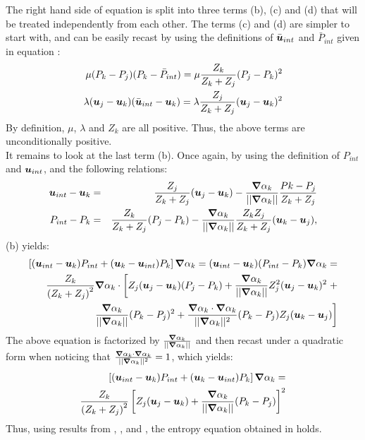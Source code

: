 The right hand side of equation  is split into three terms (b), (c) and (d) that will be treated independently from each other. The terms (c) and (d) are simpler to start with, and can be easily recast by using the definitions of $\bar{\boldsymbol u}_{int}$ and $\bar{P}_{int}$ given in equation :
\begin{eqnarray}
\label{eq:ent4}
\mu (P_k-P_j)(P_k-\bar{P}_{int}) = \mu \frac{Z_k}{Z_k+Z_j} (P_j - P_k)^2\nonumber\\
\lambda(\boldsymbol u_j-\boldsymbol u_k)(\bar{\boldsymbol u}_{int}-\boldsymbol u_k) = \lambda \frac{Z_j}{Z_k+Z_j} (\boldsymbol u_j - \boldsymbol u_k)^2 
\end{eqnarray}
By definition, $\mu$, $\lambda$ and $Z_k$ are all positive. Thus, the above terms are unconditionally positive. \\
It remains to look at the last term (b). Once again, by using the definition of $P_{int}$ and $\boldsymbol u_{int}$, and the following relations:
\begin{eqnarray}
\label{eq:ent4bis}
\boldsymbol u_{int}-\boldsymbol u_k &=& \frac{Z_j}{Z_k+Z_j}(\boldsymbol u_j-\boldsymbol u_k) -  \frac{\boldsymbol{\nabla} \alpha_k}{|| \boldsymbol{\nabla} \alpha_k ||} \frac{Pk-P_j}{Z_k+Z_j} \nonumber\\
P_{int}-P_k &=& \frac{Z_k}{Z_k+Z_j} (P_j-P_k) - \frac{\boldsymbol{\nabla} \alpha_k}{|| \boldsymbol{\nabla} \alpha_k ||} \frac{Z_k Z_j}{Z_k+Z_j} (\boldsymbol u_k-\boldsymbol u_j), \nonumber 
\end{eqnarray}
(b) yields:
\begin{eqnarray}
\label{eq:ent5}
\left[ (\boldsymbol u_{int}-\boldsymbol u_k)P_{int} + (\boldsymbol u_k-\boldsymbol u_{int})P_k \right] \boldsymbol{\nabla} \alpha_k = (\boldsymbol u_{int}-\boldsymbol u_k)(P_{int}-P_k) \boldsymbol{\nabla} \alpha_k=  \nonumber\\ \frac{Z_k}{\left( Z_k+Z_j \right)^2} \boldsymbol{\nabla} \alpha_k \cdot \left[ Z_j (\boldsymbol u_j-\boldsymbol u_k)(P_j-P_k)+\frac{\boldsymbol{\nabla} \alpha_k}{|| \boldsymbol{\nabla} \alpha_k ||} Z_j^2 (\boldsymbol u_j-\boldsymbol u_k)^2 \right. + \\ \left. \frac{\boldsymbol{\nabla} \alpha_k}{|| \boldsymbol{\nabla} \alpha_k ||}(P_k-P_j)^2 +  \frac{\boldsymbol{\nabla} \alpha_k \cdot \boldsymbol{\nabla} \alpha_k}{|| \boldsymbol{\nabla} \alpha_k ||^2}(P_k-P_j)Z_j (\boldsymbol u_k-\boldsymbol u_j) \right] \nonumber
\end{eqnarray}
The above equation is factorized by $\frac{\boldsymbol{\nabla} \alpha_k}{|| \boldsymbol{\nabla} \alpha_k ||}$ and then recast under a quadratic form when noticing that $\frac{\boldsymbol{\nabla} \alpha_k \cdot \boldsymbol{\nabla} \alpha_k}{|| \boldsymbol{\nabla} \alpha_k ||^2} = 1$, which yields:
\begin{eqnarray}
\label{eq:ent6}
\left[ (\boldsymbol u_{int}-\boldsymbol u_k)P_{int} + (\boldsymbol u_k-\boldsymbol u_{int})P_k \right] \boldsymbol{\nabla} \alpha_k =  \nonumber\\
\frac{Z_k}{\left( Z_k+Z_j \right)^2} \left[ Z_j (\boldsymbol u_j-\boldsymbol u_k)+\frac{\boldsymbol{\nabla} \alpha_k}{|| \boldsymbol{\nabla} \alpha_k ||}(P_k-P_j)\right]^2
\end{eqnarray}
Thus, using results from , ,  and , the entropy equation obtained in \cite{SEM} holds.
\pagebreak{}